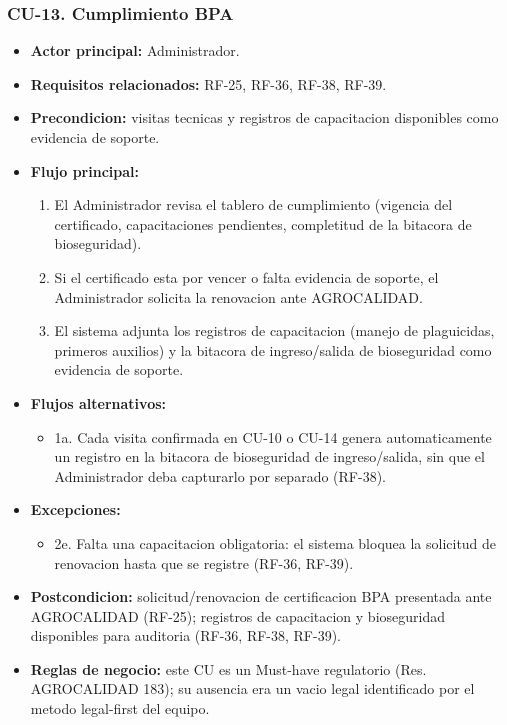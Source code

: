\documentclass[11pt,a4paper]{article}
\begin{document}
\subsubsection{CU-13. Cumplimiento BPA}
\begin{itemize}
\item \textbf{Actor principal:} Administrador.
\item \textbf{Requisitos relacionados:} RF-25, RF-36, RF-38, RF-39.
\item \textbf{Precondicion:} visitas tecnicas y registros de capacitacion disponibles como evidencia de soporte.
\item \textbf{Flujo principal:}
  \begin{enumerate}
  \item El Administrador revisa el tablero de cumplimiento (vigencia del certificado, capacitaciones pendientes, completitud de la bitacora de bioseguridad).
  \item Si el certificado esta por vencer o falta evidencia de soporte, el Administrador solicita la renovacion ante AGROCALIDAD.
  \item El sistema adjunta los registros de capacitacion (manejo de plaguicidas, primeros auxilios) y la bitacora de ingreso/salida de bioseguridad como evidencia de soporte.
  \end{enumerate}
\item \textbf{Flujos alternativos:}
  \begin{itemize}
  \item 1a. Cada visita confirmada en CU-10 o CU-14 genera automaticamente un registro en la bitacora de bioseguridad de ingreso/salida, sin que el Administrador deba capturarlo por separado (RF-38).
  \end{itemize}
\item \textbf{Excepciones:}
  \begin{itemize}
  \item 2e. Falta una capacitacion obligatoria: el sistema bloquea la solicitud de renovacion hasta que se registre (RF-36, RF-39).
  \end{itemize}
\item \textbf{Postcondicion:} solicitud/renovacion de certificacion BPA presentada ante AGROCALIDAD (RF-25); registros de capacitacion y bioseguridad disponibles para auditoria (RF-36, RF-38, RF-39).
\item \textbf{Reglas de negocio:} este CU es un Must-have regulatorio (Res. AGROCALIDAD 183); su ausencia era un vacio legal identificado por el metodo legal-first del equipo.
\end{itemize}
\end{document}
